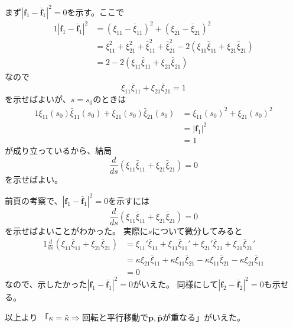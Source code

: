 \documentclass[a4j,disablejfam,dvipdfmx,papersize,slide,uplatex,21pt]{jsarticle}
\makeatletter
\renewenvironment{proof}[1][\proofname]{\par
        \pushQED{\qed}
        \normalfont
        \topsep6\p@\@plus6\p@ \trivlist
        \item[\hskip\labelsep{\bfseries #1}\@addpunct{\bfseries}]\ignorespaces
    }{%
        \popQED\endtrivlist\@endpefalse
    }
\renewcommand{\proofname}{証明.}
\makeatother
\begin{document}
\begin{proof}
    \newpage
    まず$|\bm{f}_1 - \bar{\bm{f}}_1|^2 = 0$を示す。ここで
    \begin{alignat}{1}
        |\bm{f}_1 - \bar{\bm{f}}_1|^2
            &= (\xi_{11} - \bar{\xi}_{11})^2 + (\xi_{21} - \bar{\xi}_{21})^2 \\
            &= \xi_{11}^2 + \xi_{21}^2 + \bar{\xi}_{11}^2 + \bar{\xi}_{21}^2
                - 2 (\xi_{11} \bar{\xi}_{11} + \xi_{21} \bar{\xi}_{21}) \\
            &= 2 - 2 (\xi_{11} \bar{\xi}_{11} + \xi_{21} \bar{\xi}_{21})
    \end{alignat}
    なので
    \begin{equation}
        \xi_{11} \bar{\xi}_{11} + \xi_{21} \bar{\xi}_{21} = 1
    \end{equation}
    を示せばよいが、$s = s_0$のときは
    \begin{alignat}{1}
        \xi_{11}(s_0) \bar{\xi}_{11}(s_0) + \xi_{21}(s_0) \bar{\xi}_{21}(s_0)
            &= \xi_{11}(s_0)^2 + \xi_{21}(s_0)^2 \\
            &= |\bm{f}_1|^2 \\
            &= 1
    \end{alignat}
    が成り立っているから、結局
    \begin{equation}
        \frac{d}{ds} (\xi_{11} \bar{\xi}_{11} + \xi_{21} \bar{\xi}_{21}) = 0
    \end{equation}
    を示せばよい。

    \newpage
    前頁の考察で、$|\bm{f}_1 - \bar{\bm{f}}_1|^2 = 0$を示すには
    \begin{equation}
        \frac{d}{ds} (\xi_{11} \bar{\xi}_{11} + \xi_{21} \bar{\xi}_{21}) = 0
    \end{equation}
    を示せばよいことがわかった。
    実際に$s$について微分してみると
    \begin{alignat}{1}
        \frac{d}{ds} (\xi_{11} \bar{\xi}_{11} + \xi_{21} \bar{\xi}_{21})
            &= \xi_{11}' \bar{\xi}_{11} + \xi_{11} \bar{\xi}_{11}'
                + \xi_{21}' \bar{\xi}_{21} + \xi_{21} \bar{\xi}_{21}' \\
            &= \kappa \xi_{21} \bar{\xi}_{11} + \kappa \xi_{11} \bar{\xi}_{21}
                - \kappa \xi_{11} \bar{\xi}_{21} - \kappa \xi_{21} \bar{\xi}_{11} \\
            &= 0
    \end{alignat}
    なので、示したかった$|\bm{f}_1 - \bar{\bm{f}}_1|^2 = 0$がいえた。
    同様にして$|\bm{f}_2 - \bar{\bm{f}}_2|^2 = 0$も示せる。

    以上より
    「$\kappa = \bar{\kappa} \Rightarrow \text{回転と平行移動で$\bm{p}, \bar{\bm{p}}$が重なる}$」がいえた。
\end{proof}
\end{document}
